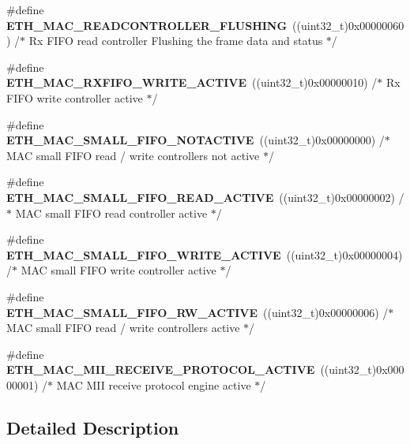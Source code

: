 \begin{DoxyCompactItemize}
\#define {\bfseries E\+T\+H\+\_\+\+M\+A\+C\+\_\+\+R\+E\+A\+D\+C\+O\+N\+T\+R\+O\+L\+L\+E\+R\+\_\+\+F\+L\+U\+S\+H\+I\+NG}~((uint32\+\_\+t)0x00000060)  /$\ast$ Rx F\+I\+F\+O read controller Flushing the frame data and status $\ast$/
\item 
\mbox{\label{group___h_a_l___e_t_h___aliased___defines_gaed7a7d977c0411b7303270d6c35e19d2}} 
\#define {\bfseries E\+T\+H\+\_\+\+M\+A\+C\+\_\+\+R\+X\+F\+I\+F\+O\+\_\+\+W\+R\+I\+T\+E\+\_\+\+A\+C\+T\+I\+VE}~((uint32\+\_\+t)0x00000010)  /$\ast$ Rx F\+I\+F\+O write controller active $\ast$/
\item 
\mbox{\label{group___h_a_l___e_t_h___aliased___defines_gac16927a1916a399766258aa819372c68}} 
\#define {\bfseries E\+T\+H\+\_\+\+M\+A\+C\+\_\+\+S\+M\+A\+L\+L\+\_\+\+F\+I\+F\+O\+\_\+\+N\+O\+T\+A\+C\+T\+I\+VE}~((uint32\+\_\+t)0x00000000)  /$\ast$ M\+A\+C small F\+I\+F\+O read / write controllers not active $\ast$/
\item 
\mbox{\label{group___h_a_l___e_t_h___aliased___defines_gaaeb391df53728b1ee3d7dc0f26c89f05}} 
\#define {\bfseries E\+T\+H\+\_\+\+M\+A\+C\+\_\+\+S\+M\+A\+L\+L\+\_\+\+F\+I\+F\+O\+\_\+\+R\+E\+A\+D\+\_\+\+A\+C\+T\+I\+VE}~((uint32\+\_\+t)0x00000002)  /$\ast$ M\+A\+C small F\+I\+F\+O read controller active $\ast$/
\item 
\mbox{\label{group___h_a_l___e_t_h___aliased___defines_ga54622c82079395c06def322572f42d90}} 
\#define {\bfseries E\+T\+H\+\_\+\+M\+A\+C\+\_\+\+S\+M\+A\+L\+L\+\_\+\+F\+I\+F\+O\+\_\+\+W\+R\+I\+T\+E\+\_\+\+A\+C\+T\+I\+VE}~((uint32\+\_\+t)0x00000004)  /$\ast$ M\+A\+C small F\+I\+F\+O write controller active $\ast$/
\item 
\mbox{\label{group___h_a_l___e_t_h___aliased___defines_gaef20d59c181d5c3c828ea428e7c0d81e}} 
\#define {\bfseries E\+T\+H\+\_\+\+M\+A\+C\+\_\+\+S\+M\+A\+L\+L\+\_\+\+F\+I\+F\+O\+\_\+\+R\+W\+\_\+\+A\+C\+T\+I\+VE}~((uint32\+\_\+t)0x00000006)  /$\ast$ M\+A\+C small F\+I\+F\+O read / write controllers active $\ast$/
\item 
\mbox{\label{group___h_a_l___e_t_h___aliased___defines_ga69bdbf3c1abe74dde1f5e1d2a85a501e}} 
\#define {\bfseries E\+T\+H\+\_\+\+M\+A\+C\+\_\+\+M\+I\+I\+\_\+\+R\+E\+C\+E\+I\+V\+E\+\_\+\+P\+R\+O\+T\+O\+C\+O\+L\+\_\+\+A\+C\+T\+I\+VE}~((uint32\+\_\+t)0x00000001)  /$\ast$ M\+A\+C M\+I\+I receive protocol engine active $\ast$/
\end{DoxyCompactItemize}


\subsection{Detailed Description}
